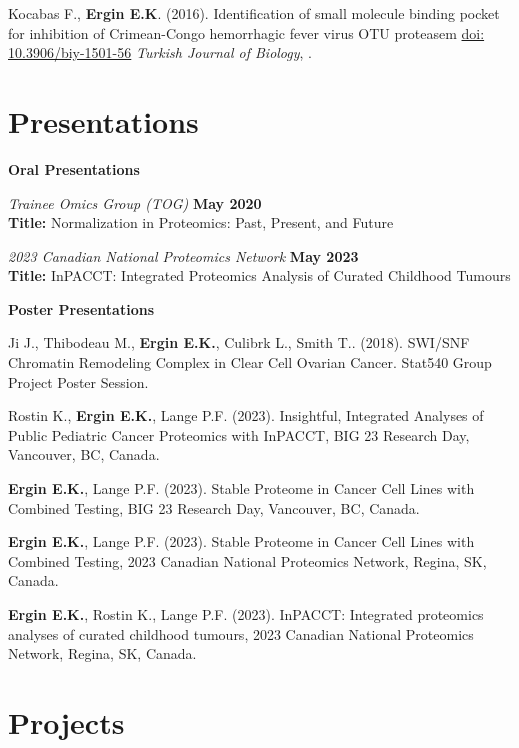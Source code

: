 \documentclass[margin,line]{res}
\begin{document}
\begin{resume}
Kocabas F., {\bf Ergin E.K}. (2016). Identification of small molecule binding pocket for inhibition of Crimean-Congo hemorrhagic fever virus OTU proteasem \href{https://www.researchgate.net/profile/Fatih_Kocabas/publication/284188739_Identification_of_small_molecule_binding_pocket_for_inhibition_of_Crimean-Congo_hemorrhagic_fever_virus_OTU_protease/links/564f6a0b08aefe619b11de98.pdf}{doi: 10.3906/biy-1501-56} {\em Turkish Journal of Biology}, .


\section{\sc Presentations}
{\bf Oral Presentations}

\vspace{-.3cm}
{\em Trainee Omics Group (TOG)} \hfill {\bf May 2020}\\
{\bf Title:} Normalization in Proteomics: Past, Present, and Future

{\em 2023 Canadian National Proteomics Network} \hfill {\bf May 2023}\\
{\bf Title:} InPACCT: Integrated Proteomics Analysis of Curated Childhood Tumours



{\bf Poster Presentations}

\vspace{-.3cm}
Ji J., Thibodeau M., {\bf Ergin E.K.}, Culibrk L., Smith T.. (2018). SWI/SNF Chromatin Remodeling Complex in Clear Cell Ovarian Cancer. Stat540 Group Project Poster Session.

Rostin K., {\bf Ergin E.K.}, Lange P.F. (2023). Insightful, Integrated Analyses of Public Pediatric Cancer Proteomics with InPACCT, BIG 23 Research Day, Vancouver, BC, Canada.

{\bf Ergin E.K.}, Lange P.F. (2023). Stable Proteome in Cancer Cell Lines with Combined Testing, BIG 23 Research Day, Vancouver, BC, Canada.

{\bf Ergin E.K.}, Lange P.F. (2023). Stable Proteome in Cancer Cell Lines with Combined Testing, 2023 Canadian National Proteomics Network, Regina, SK, Canada.

{\bf Ergin E.K.}, Rostin K., Lange P.F. (2023). InPACCT: Integrated proteomics analyses of curated childhood tumours, 2023 Canadian National Proteomics Network, Regina, SK, Canada.

\section{\sc Projects}


\end{resume}
\end{document}
